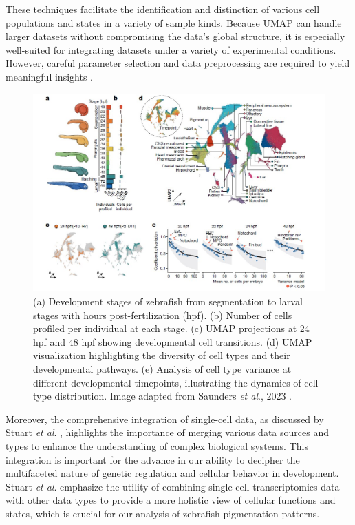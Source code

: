 \documentclass[runningheads]{llncs}
\begin{document}
These techniques facilitate the identification and distinction of various cell populations and states in a variety of sample kinds. Because UMAP can handle larger datasets without compromising the data's global structure, it is especially well-suited for integrating datasets under a variety of experimental conditions. However, careful parameter selection and data preprocessing are required to yield meaningful insights \cite{nayak2021hitchhiker}.
\begin{figure}[htbp]
    \centering
    \includegraphics[width=\textwidth]{Fig1.jpg}
    \caption{(a) Development stages of zebrafish from segmentation to larval stages with hours post-fertilization (hpf). (b) Number of cells profiled per individual at each stage. (c) UMAP projections at 24 hpf and 48 hpf showing developmental cell transitions. (d) UMAP visualization highlighting the diversity of cell types and their developmental pathways. (e) Analysis of cell type variance at different developmental timepoints, illustrating the dynamics of cell type distribution. Image adapted from Saunders \textit{et al}., 2023 \cite{saunders2023embryo}.}
    \label{fig:development_stages_cells}
\end{figure}
Moreover, the comprehensive integration of single-cell data, as discussed by Stuart \textit{et al}. \cite{stuart2019comprehensive}, highlights the importance of merging various data sources and types to enhance the understanding of complex biological systems. This integration is important for the advance in our ability to decipher the multifaceted nature of genetic regulation and cellular behavior in development. Stuart \textit{et al}. emphasize the utility of combining single-cell transcriptomics data with other data types to provide a more holistic view of cellular functions and states, which is crucial for our analysis of zebrafish pigmentation patterns.
\end{document}
